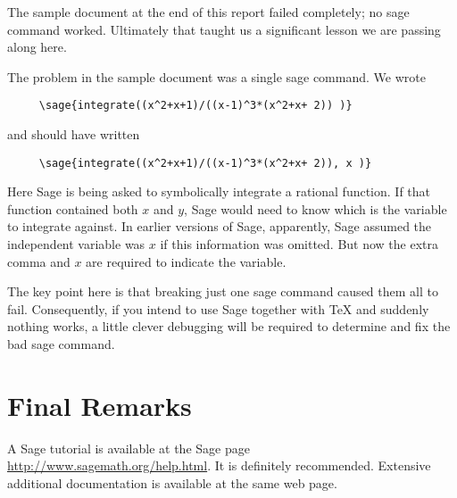 \documentclass[11pt, oneside]{amsart}
\begin{document}
The sample  document at the end of this report failed completely; no sage command worked. Ultimately that taught us a significant lesson we are passing along here.

The problem in the sample document was a single sage command. We wrote 
\begin{verbatim}
     \sage{integrate((x^2+x+1)/((x-1)^3*(x^2+x+ 2)) )}
\end{verbatim}
and should have written
\begin{verbatim}
     \sage{integrate((x^2+x+1)/((x-1)^3*(x^2+x+ 2)), x )}
\end{verbatim}
Here Sage is being asked to symbolically integrate a rational function. If that function contained both $x$ and $y$, Sage would need to know which is the variable to integrate against. In earlier versions of Sage, apparently, Sage assumed the independent variable was $x$ if this information was omitted.  But now the extra comma and $x$ are required to indicate the variable.

The key point here is that breaking just one sage command caused them all to fail. Consequently, if you intend to use Sage together with TeX and suddenly nothing works, a little clever debugging will be required to determine and fix the bad sage command.



\section{Final Remarks}
 
A Sage tutorial is available at the Sage page \url{http://www.sagemath.org/help.html}. It is definitely recommended. Extensive additional documentation is available at the same web page.
\end{document}

